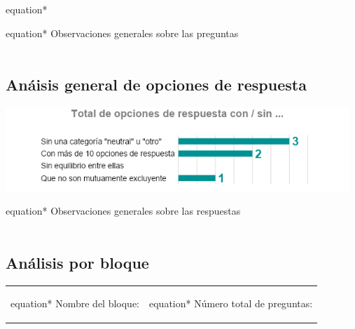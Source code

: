 \documentclass[10,a4paperpaper,]{article}
\begin{document}
\begin{center}
    \begin{mybox}[colback=white, width = 7cm]{equation*}
    \end{mybox}
\end{center}

\begin{center}
  \begin{mybox}[colback=white, width = 7cm]{equation*}
    Observaciones generales sobre las preguntas \\
    \\
  \end{mybox}
\end{center}

\newpage

\subsection{Anáisis general de opciones de respuesta}

\begin{center}
    \includegraphics[width=13cm]{figures/Caftsq.png} 
    \begin{mybox}[colback=white, width = 7cm]{equation*}
    Observaciones generales sobre las respuestas \\
    \\
    \end{mybox}
\end{center}

\subsection{Análisis por bloque}

\begin{center}
    \begin{tabular}{ c  c }
      \begin{mybox}[colback=white, width = 7cm]{equation*}
      Nombre del bloque: 
      \end{mybox}
      & 
      \begin{mybox}[colback=white, width = 7cm]{equation*}
      Número total de preguntas: 
      \end{mybox}
    \end{tabular}
\end{center}
\end{document}

